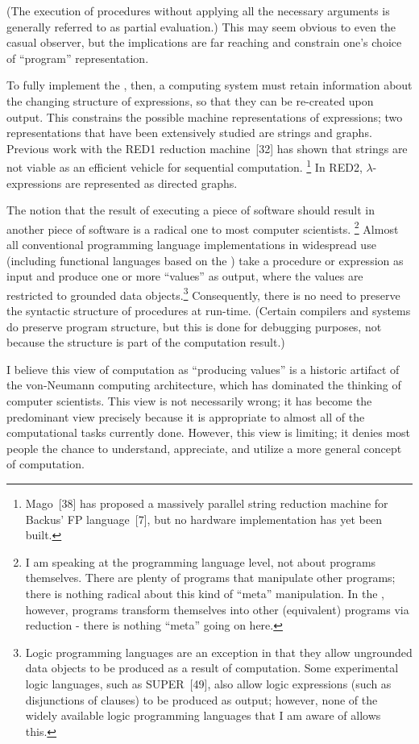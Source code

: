 (The execution of procedures without applying all the necessary arguments is
generally referred to as partial evaluation.) This may seem obvious to even the
casual observer, but the implications are far reaching and constrain one's
choice of ``program'' representation.

To fully implement the \lambdacalculus, then, a computing system must retain
information about the changing structure of expressions, so that they can be
re-created upon output. This constrains the possible machine representations of
expressions; two representations that have been extensively studied are strings
and graphs. Previous work with the RED1 reduction machine~[32] has shown that
strings are not viable as an efficient vehicle for sequential computation.
\footnote{Mago~[38] has proposed a massively parallel string reduction machine
for Backus' FP language~[7], but no hardware implementation has yet been built.}
In RED2, \(\lambda\)-expressions are represented as directed graphs.

The notion that the result of executing a piece of software should result in
another piece of software is a radical one to most computer scientists.
\footnote{I am speaking at the programming language level, not about programs
themselves. There are plenty of programs that manipulate other programs; there
is nothing radical about this kind of ``meta'' manipulation. In the
\lambdacalculus, however, programs transform themselves into other (equivalent)
programs via reduction - there is nothing ``meta'' going on here.} Almost all
conventional programming language implementations in widespread use (including
functional languages based on the \lambdacalculus) take a procedure or
expression as input and produce one or more ``values'' as output, where the
values are restricted to grounded data objects.\footnote{Logic programming
languages are an exception in that they allow ungrounded data objects to be
produced as a result of computation. Some experimental logic languages, such as
SUPER~[49], also allow logic expressions (such as disjunctions of clauses) to be
produced as output; however, none of the widely available logic programming
languages that I am aware of allows this.} Consequently, there is no need to
preserve the syntactic structure of procedures at run-time. (Certain compilers
and systems do preserve program structure, but this is done for debugging
purposes, not because the structure is part of the computation result.)

I believe this view of computation as ``producing values'' is a historic
artifact of the von-Neumann computing architecture, which has dominated the
thinking of computer scientists. This view is not necessarily wrong; it has
become the predominant view precisely because it is appropriate to almost all of
the computational tasks currently done. However, this view is limiting; it denies
most people the chance to understand, appreciate, and utilize a more general
concept of computation.

